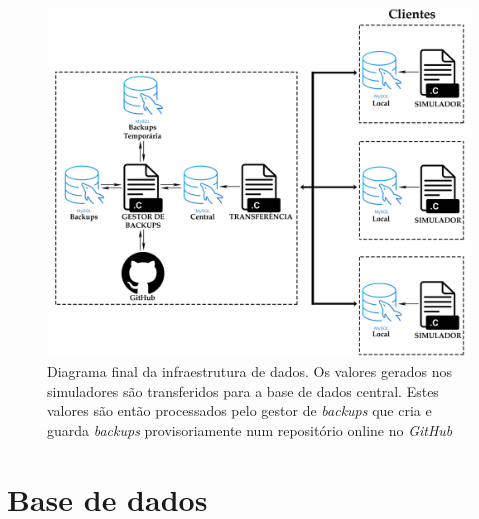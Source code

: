 \documentclass[11pt,twoside,a4paper]{report}
\begin{document}
\begin{figure}
	\begin{center}
		\includegraphics[width=1\textwidth]{Esquema_Projeto_6} %
		\caption[Diagrama final da infraestrutura]{Diagrama final da infraestrutura de dados. Os valores gerados nos simuladores são transferidos para a base de dados central. Estes valores são então processados pelo gestor de \textit{backups} que cria e guarda \textit{backups} provisoriamente num repositório online no \textit{GitHub}}
		\label{fig:infra3}
		\end{center}
\end{figure}

\section{Base de dados}
\end{document}
